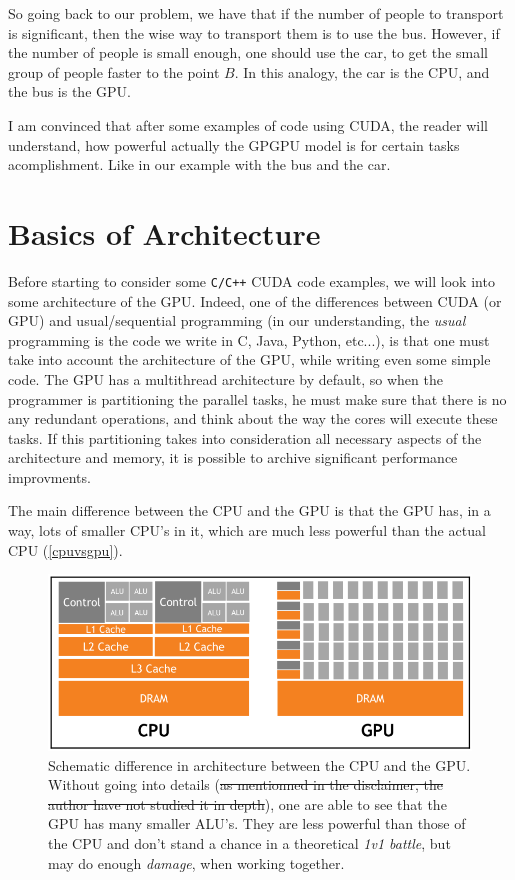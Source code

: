 \documentclass[12pt]{article}
\begin{document}
So going back to our problem, we have that if the number of people to transport is significant, 
then the wise way to transport them is to use the bus. However, if the number of people is small enough, 
one should use the car, to get the small group of people faster to the point $B$. 
In this analogy, the car is the CPU, and the bus is the GPU.

I am convinced that after some examples of code using CUDA, the reader will understand, how powerful
actually the GPGPU model is for certain tasks acomplishment. Like in our example with the bus and the car.

\section{Basics of Architecture}

Before starting to consider some \verb|C/C++| CUDA code examples, we will look into some architecture of the GPU. 
Indeed, one of the differences between CUDA (or GPU) and usual/sequential programming (in our understanding, the
\textit{usual} programming is the code we write in C, Java, Python, etc...), 
is that one must take into account
the architecture of the GPU, while writing even some simple code. The GPU has a multithread architecture by default, 
so when the programmer is partitioning the parallel tasks, he must make sure that there is no any redundant
operations, and think about the way the cores will execute these tasks. If this partitioning takes into consideration all necessary aspects of the architecture and memory, it is possible to archive significant performance improvments.


The main difference between the CPU and the GPU is that the GPU has, in a way, lots of smaller CPU's in it, which 
are much less powerful than the actual CPU (\autoref{cpuvsgpu}).
\cite{tuomanen2018hands}

\begin{figure}
   \centering
   \includegraphics[scale=0.4]{pngs/cpuvsgpu.png}
   \caption{Schematic difference in architecture between the CPU and the GPU. Without going into details 
   (\sout{as mentionned in the disclaimer, the author have not studied it in depth}), one are able to see that 
   the GPU has many smaller ALU's. They are less powerful than those of the CPU and don't stand a chance in 
    a theoretical \textit{1v1 battle}, but may do enough \textit{damage}, when working together.\cite{tuomanen2018hands}}
   \label{cpuvsgpu}
\end{figure}
\end{document}
